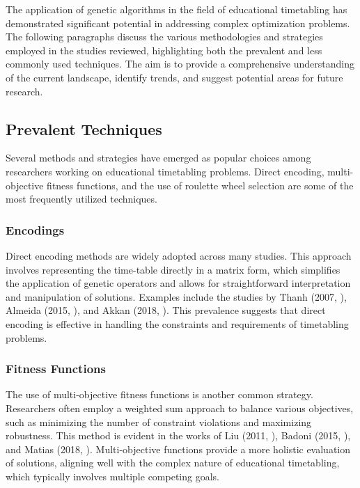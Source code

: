 \documentclass[sigconf]{acmart}
\begin{document}

The application of genetic algorithms in the field of educational timetabling
has demonstrated significant potential in addressing complex optimization
problems. The following paragraphs discuss the various methodologies and
strategies employed in the studies reviewed, highlighting both the prevalent
and less commonly used techniques.
The aim is to provide a comprehensive understanding of the current landscape,
identify trends, and suggest potential areas for future research.

\subsection{Prevalent Techniques}
Several methods and strategies have emerged as popular choices among researchers
working on educational timetabling problems. Direct encoding, multi-objective
fitness functions, and the use of roulette wheel selection are some of the most
frequently utilized techniques.

\subsubsection{Encodings}
Direct encoding methods are widely adopted across many studies. This approach
involves representing the time-table directly in a matrix form, which simplifies
the application of genetic operators and allows for straightforward
interpretation and manipulation of solutions.
Examples include the studies by Thanh (2007, \cite{Thanh2007}),
Almeida (2015, \cite{Almeida2015}), and Akkan (2018, \cite{Akkan2018}).
This prevalence suggests that direct encoding is effective in handling the
constraints and requirements of timetabling problems.

\subsubsection{Fitness Functions}
The use of multi-objective fitness functions is another common strategy.
Researchers often employ a weighted sum approach to balance various objectives,
such as minimizing the number of constraint violations and maximizing
robustness. This method is evident in the works of Liu
(2011, \cite{Liu2011}), Badoni (2015, \cite{Badoni2015}), and Matias
(2018, \cite{Matias2018fair}).
Multi-objective functions provide a more holistic evaluation
of solutions, aligning well with the complex nature of educational timetabling,
which typically involves multiple competing goals.
\end{document}
